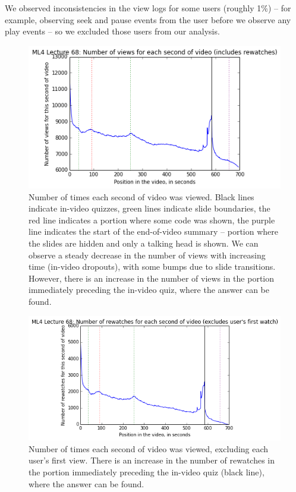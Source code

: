 \documentclass{sigchi}
\begin{document}
We observed inconsistencies in the view logs for some users (roughly 1\%) -- for example, observing seek and pause events from the user before we observe any play events -- so we excluded those users from our analysis.

\begin{figure}
\includegraphics[width=1.0\columnwidth]{videoviewsall}
\caption{Number of times each second of video was viewed. Black lines indicate in-video quizzes, green lines indicate slide boundaries, the red line indicates a portion where some code was shown, the purple line indicates the start of the end-of-video summary -- portion where the slides are hidden and only a talking head is shown. We can observe a steady decrease in the number of views with increasing time (in-video dropouts), with some bumps due to slide transitions. However, there is an increase in the number of views in the portion immediately preceding the in-video quiz, where the answer can be found.}
\label{fig:videoviewsall}
\end{figure}

\begin{figure}
\includegraphics[width=1.0\columnwidth]{rewatches}
\caption{Number of times each second of video was viewed, excluding each user's first view. There is an increase in the number of rewatches in the portion immediately preceding the in-video quiz (black line), where the answer can be found.}
\label{fig:rewatches}
\end{figure}
\end{document}
